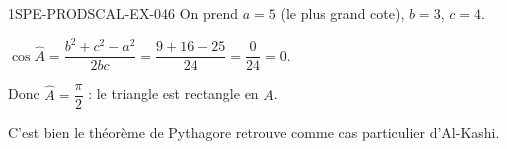 \begin{corrige}{1SPE-PRODSCAL-EX-046}
On prend $a = 5$ (le plus grand cote), $b = 3$, $c = 4$.

$\cos\widehat{A} = \dfrac{b^2+c^2-a^2}{2bc} = \dfrac{9+16-25}{24} = \dfrac{0}{24} = 0$.

Donc $\widehat{A} = \dfrac{\pi}{2}$ : le triangle est rectangle en $A$.

C'est bien le théorème de Pythagore retrouve comme cas particulier d'Al-Kashi.
\end{corrige}
